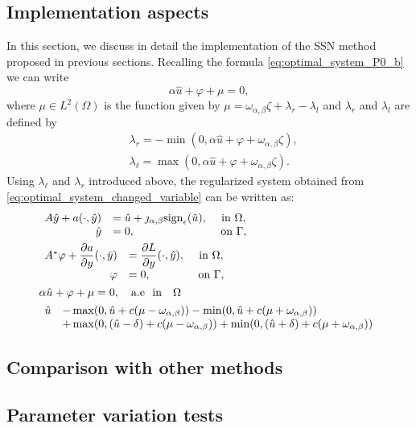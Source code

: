 \documentclass[11pt,a4paper]{amsart}
\newcommand{\om}{\Omega}
\newcommand{\ga}{\Gamma}
\newcommand{\sign}{\mathrm{sign}}
\begin{document}
\subsection{Implementation aspects}
In this section, we discuss in detail the implementation of the SSN method proposed in previous sections. Recalling the formula \eqref{eq:optimal_system_P0_b}\, we can write
\begin{equation}
    \alpha\hat u + \varphi +\mu =0, 
\end{equation}
where $\mu \in L^2(\om)$ is the function given by $\mu = \omega_{\alpha,\beta} \zeta + \lambda_r-\lambda_l$ and $\lambda_r$ and $\lambda_l$ are defined by 
\begin{align}
    &\lambda_r = -\min(0,\alpha \hat u  + \varphi  + \omega_{\alpha,\beta}\zeta), \\
    &\lambda_\ell =\max(0,\alpha \hat u  + \varphi  + \omega_{\alpha,\beta}\zeta).
\end{align}
Using $\lambda_\ell$ and $\lambda_r$ introduced above, the regularized system obtained from \eqref{eq:optimal_system_changed_variable} can be written as:
\begin{subequations}\label{eq:KKT-like}
	\begin{align}
&\begin{array}{rlc}\label{eq:KKT_1}
	A\hat y + a(\cdot, \hat y) & = \hat u + \jmath_{\alpha,\beta}\sign_\epsilon(\hat u), & \text{ in } \om, \\
      \hat y &= 0, & \text{ on } \ga,  
\end{array}\\
%
&\begin{array}{rlc}\label{eq:KKT_2}
	A^*\varphi + \dfrac{\partial a}{\partial y}(\cdot,\bar y) & = \dfrac{\partial L}{\partial y}(\cdot,\hat y),& \text{ in } \om, \\
      \varphi &= 0, & \text{ on } \ga ,
\end{array} \\
&\alpha \hat u +\varphi + \mu =0, \quad\text{a.e\,\, in}\quad \om \label{eq:KKT_3}\\
&\begin{array}{ll}\label{eq:KKT_4}
 \hat u &- \max(0, \hat u  +c(\mu-\omega_{\alpha,\beta}) )- \min(0, \hat u  +c(\mu+\omega_{\alpha,\beta}) )\\
 &+\max(0,(\hat u-\delta)+c (\mu-\omega_{\alpha,\beta})) + \min(0,(\hat u+\delta)+ c(\mu+\omega_{\alpha,\beta}))
\end{array}
\end{align}
\end{subequations}	
\subsection{Comparison with other methods}
\subsection{Parameter variation tests}



\end{document}
